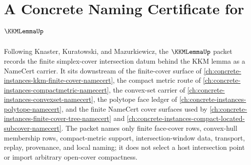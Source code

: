 \chapter{A Concrete Naming Certificate for $\KKMLemmaUp$}
\label{ch:concrete-instances-kkm-lemma-namecert}

Following Knaster, Kuratowski, and Mazurkiewicz, the $\KKMLemmaUp$ packet records the finite simplex-cover intersection datum behind the KKM lemma as a NameCert carrier. It sits downstream of the finite-cover surface of \autoref{ch:concrete-instances-kkm-finite-cover-namecert}, the compact metric route of \autoref{ch:concrete-instances-compactmetric-namecert}, the convex-set carrier of \autoref{ch:concrete-instances-convexset-namecert}, the polytope face ledger of \autoref{ch:concrete-instances-polytope-namecert}, and the finite NameCert cover surfaces used by \autoref{ch:concrete-instances-finite-cover-tree-namecert} and \autoref{ch:concrete-instances-compact-located-subcover-namecert}. The packet names only finite face-cover rows, convex-hull membership rows, compact-metric support, intersection-window data, transport, replay, provenance, and local naming; it does not select a host intersection point or import arbitrary open-cover compactness.

